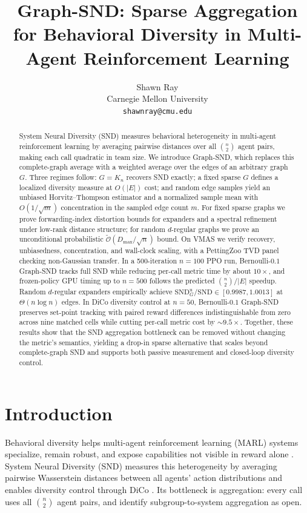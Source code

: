 \documentclass{article}
\title{Graph-SND: Sparse Aggregation for Behavioral Diversity in
Multi-Agent Reinforcement Learning}
\author{%
  Shawn Ray \\
  Carnegie Mellon University \\
  \texttt{shawnray@cmu.edu} \\
}
\theoremstyle{plain}
\theoremstyle{definition}
\theoremstyle{remark}
\newcommand{\SND}{\ensuremath{\mathrm{SND}}}
\newcommand{\SNDG}{\mathrm{SND}_{G}}
\begin{document}
\maketitle

\begin{abstract}
System Neural Diversity (SND) measures behavioral heterogeneity in
multi-agent reinforcement learning by averaging pairwise distances over
all $\binom{n}{2}$ agent pairs, making each call quadratic in team size.
We introduce Graph-SND, which replaces this complete-graph average with
a weighted average over the edges of an arbitrary graph $G$. Three
regimes follow: $G=K_n$ recovers SND exactly; a fixed sparse $G$ defines
a localized diversity measure at $O(|E|)$ cost; and random edge samples
yield an unbiased Horvitz--Thompson estimator and a normalized sample
mean with $O(1/\sqrt{m})$ concentration in the sampled edge count $m$.
For fixed sparse graphs we prove forwarding-index distortion bounds for
expanders and a spectral refinement under low-rank distance structure;
for random $d$-regular graphs we prove an unconditional probabilistic
$\widetilde{\mathcal{O}}(D_{\max}/\sqrt{n})$ bound. On VMAS we verify
recovery, unbiasedness, concentration, and wall-clock scaling, with a
PettingZoo TVD panel checking non-Gaussian transfer. In a 500-iteration
$n=100$ PPO run, Bernoulli-$0.1$ Graph-SND tracks full SND while
reducing per-call metric time by about $10\times$, and frozen-policy
GPU timing up to $n=500$ follows the predicted $\binom{n}{2}/|E|$
speedup. Random $d$-regular expanders empirically achieve
$\SNDG^{\mathrm{u}}/\SND\in[0.9987,1.0013]$ at $\Theta(n\log n)$ edges.
In DiCo diversity control at $n=50$, Bernoulli-$0.1$ Graph-SND preserves
set-point tracking with paired reward differences indistinguishable from
zero across nine matched cells while cutting per-call metric cost by
${\sim}9.5\times$. Together, these results show that the SND aggregation
bottleneck can be removed without changing the metric's semantics,
yielding a drop-in sparse alternative that scales beyond complete-graph
SND and supports both passive measurement and closed-loop diversity
control.
\end{abstract}
\section{Introduction}
\label{sec:intro}

Behavioral diversity helps multi-agent reinforcement learning (MARL)
systems specialize, remain robust, and expose capabilities not visible in
reward alone \citep{bettini2023hetgppo,bettini2025snd}. System Neural
Diversity (SND) \citep{bettini2025snd} measures this heterogeneity by
averaging pairwise Wasserstein distances between all agents' action
distributions and enables diversity control through DiCo
\citep{bettini2024dico}. Its bottleneck is aggregation: every call uses
all $\binom{n}{2}$ agent pairs, and \citet[\S6]{bettini2025snd} identify
subgroup-to-system aggregation as open.
\end{document}
